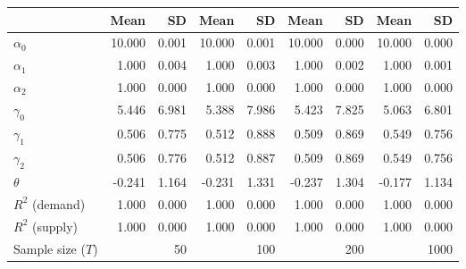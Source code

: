 
\begin{tabular}[t]{lrrrrrrrr}
\toprule
  & Mean & SD & Mean  & SD  & Mean   & SD   & Mean    & SD   \\
\midrule
$\alpha_{0}$ & 10.000 & 0.001 & 10.000 & 0.001 & 10.000 & 0.000 & 10.000 & 0.000\\
$\alpha_{1}$ & 1.000 & 0.004 & 1.000 & 0.003 & 1.000 & 0.002 & 1.000 & 0.001\\
$\alpha_{2}$ & 1.000 & 0.000 & 1.000 & 0.000 & 1.000 & 0.000 & 1.000 & 0.000\\
$\gamma_{0}$ & 5.446 & 6.981 & 5.388 & 7.986 & 5.423 & 7.825 & 5.063 & 6.801\\
$\gamma_{1}$ & 0.506 & 0.775 & 0.512 & 0.888 & 0.509 & 0.869 & 0.549 & 0.756\\
$\gamma_{2}$ & 0.506 & 0.776 & 0.512 & 0.887 & 0.509 & 0.869 & 0.549 & 0.756\\
$\theta$ & -0.241 & 1.164 & -0.231 & 1.331 & -0.237 & 1.304 & -0.177 & 1.134\\
$R^{2}$ (demand) & 1.000 & 0.000 & 1.000 & 0.000 & 1.000 & 0.000 & 1.000 & 0.000\\
$R^{2}$ (supply) & 1.000 & 0.000 & 1.000 & 0.000 & 1.000 & 0.000 & 1.000 & 0.000\\
Sample size ($T$) &  & 50 &  & 100 &  & 200 &  & 1000\\
\bottomrule
\end{tabular}
